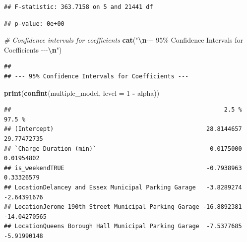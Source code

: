 \documentclass[
  12pt,
]{article}
\newenvironment{Shaded}{\begin{snugshade}}{\end{snugshade}}
\newcommand{\AttributeTok}[1]{\textcolor[rgb]{0.13,0.29,0.53}{#1}}
\newcommand{\CommentTok}[1]{\textcolor[rgb]{0.56,0.35,0.01}{\textit{#1}}}
\newcommand{\ConstantTok}[1]{\textcolor[rgb]{0.56,0.35,0.01}{#1}}
\newcommand{\DecValTok}[1]{\textcolor[rgb]{0.00,0.00,0.81}{#1}}
\newcommand{\FunctionTok}[1]{\textcolor[rgb]{0.13,0.29,0.53}{\textbf{#1}}}
\newcommand{\NormalTok}[1]{#1}
\newcommand{\SpecialCharTok}[1]{\textcolor[rgb]{0.81,0.36,0.00}{\textbf{#1}}}
\newcommand{\StringTok}[1]{\textcolor[rgb]{0.31,0.60,0.02}{#1}}
\begin{document}
\begin{verbatim}
## F-statistic: 363.7158 on 5 and 21441 df
\end{verbatim}

\begin{Shaded}
\end{Shaded}

\begin{verbatim}
## p-value: 0e+00
\end{verbatim}

\begin{Shaded}
\begin{Highlighting}[]
\CommentTok{\# Confidence intervals for coefficients}
\FunctionTok{cat}\NormalTok{(}\StringTok{"}\SpecialCharTok{\textbackslash{}n}\StringTok{{-}{-}{-} 95\% Confidence Intervals for Coefficients {-}{-}{-}}\SpecialCharTok{\textbackslash{}n}\StringTok{"}\NormalTok{)}
\end{Highlighting}
\end{Shaded}

\begin{verbatim}
## 
## --- 95% Confidence Intervals for Coefficients ---
\end{verbatim}

\begin{Shaded}
\begin{Highlighting}[]
\FunctionTok{print}\NormalTok{(}\FunctionTok{confint}\NormalTok{(multiple\_model, }\AttributeTok{level =} \DecValTok{1} \SpecialCharTok{{-}}\NormalTok{ alpha))}
\end{Highlighting}
\end{Shaded}

\begin{verbatim}
##                                                            2.5 %       97.5 %
## (Intercept)                                           28.8144657  29.77472735
## `Charge Duration (min)`                                0.0175000   0.01954802
## is_weekendTRUE                                        -0.7938963   0.33326579
## LocationDelancey and Essex Municipal Parking Garage   -3.8289274  -2.64391676
## LocationJerome 190th Street Municipal Parking Garage -16.8892381 -14.04270565
## LocationQueens Borough Hall Municipal Parking Garage  -7.5377685  -5.91990148
\end{verbatim}
\end{document}
